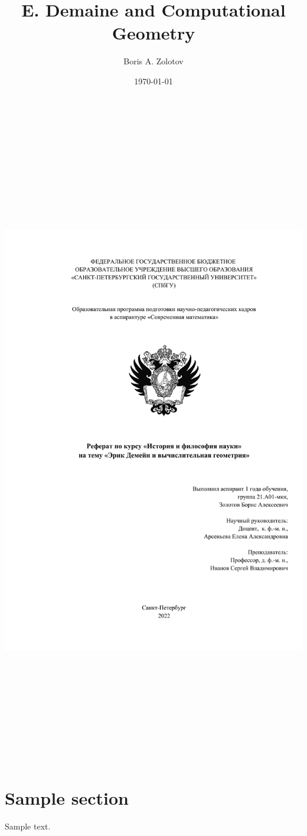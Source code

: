 \documentclass[a4paper,12pt]{article}
\begin{document}
\thispagestyle{empty}


\title{E. Demaine and Computational Geometry}
\author{Boris A. Zolotov}
\date{\today}

\begin{center}
	\includegraphics[height=28.7cm]{titlepdfpage}
\end{center}

\restoregeometry

\newpage \maketitle \vspace{1cm}

\tableofcontents \vfill \eject

\section{Sample section}

Sample text.
\end{document}
